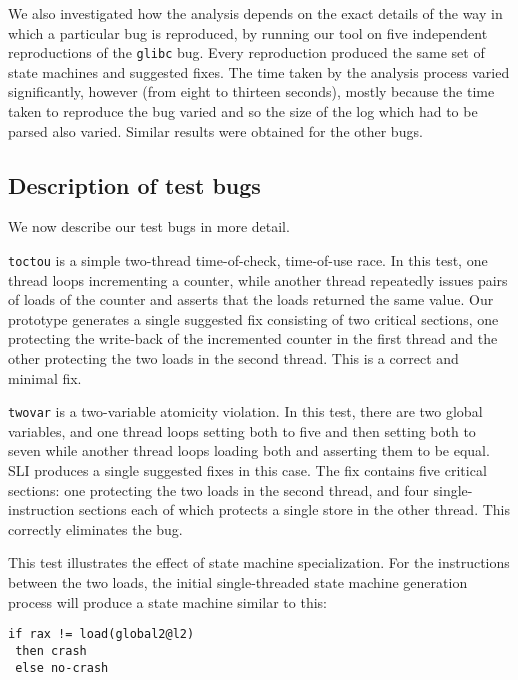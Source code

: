 \documentclass[10pt,twocolumn,preprint,natbib,authoryear]{sigplanconf}
\newcommand{\editorial}[1]{}
\begin{document}
We also investigated how the analysis depends on the exact details of
the way in which a particular bug is reproduced, by running our tool
on five independent reproductions of the \verb|glibc| bug.  Every
reproduction produced the same set of state machines and suggested
fixes.  The time taken by the analysis process varied significantly,
however (from eight to thirteen seconds), mostly because the time
taken to reproduce the bug varied and so the size of the log which had
to be parsed also varied.  Similar results were obtained for the other
bugs.\editorial{Not sure this is all that interesting, or that I've
  phrased it very well...}

\subsection{Description of test bugs}
\label{sect:bug_descr}

We now describe our test bugs in more detail.

\verb|toctou| is a simple two-thread time-of-check, time-of-use race.
In this test, one thread loops incrementing a counter, while another
thread repeatedly issues pairs of loads of the counter and asserts
that the loads returned the same value.  Our prototype generates a
single suggested fix consisting of two critical sections, one
protecting the write-back of the incremented counter in the first
thread and the other protecting the two loads in the second thread.
This is a correct and minimal fix.

\verb|twovar| is a two-variable atomicity violation.  In this test,
there are two global variables, and one thread loops setting both to
five and then setting both to seven while another thread loops loading
both and asserting them to be equal.  SLI produces a single suggested
fixes in this case.  The fix contains five critical sections: one
protecting the two loads in the second thread, and four
single-instruction sections each of which protects a single store in
the other thread.  This correctly eliminates the bug.

This test illustrates the effect of state machine specialization.  For
the instructions between the two loads, the initial single-threaded
state machine generation process will produce a state machine similar
to this:

\begin{verbatim}
if rax != load(global2@l2)
 then crash
 else no-crash
\end{verbatim}
\end{document}

